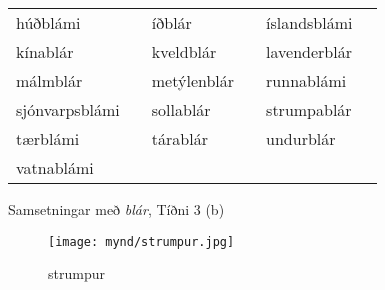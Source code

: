 \documentclass[../samsetningasafn.tex]{subfiles}
\begin{document}
\begin{wordlist}[H]
\begin{tcolorbox}

	\setlength{\extrarowheight}{3pt}
	\begin{tabular}{BlBlBl}		
		húðblámi	&	\phantom{baa}	& 		
		íðblár		&	\phantom{baa}	& 		
		íslandsblámi	&	\phantom{baa}	\\ 	
		kínablár		&		& 		
		kveldblár	&		& 		
		lavenderblár	&		\\ 	
		málmblár	&		& 	
		metýlenblár	&		& 	
		runnablámi	&		\\ 	
		sjónvarpsblámi &		& 	
		sollablár		&		& 		
		strumpablár	&		\\ 	
		tærblámi	&		& 		
		tárablár		&		& 	
		undurblár	&		\\ 	
		vatnablámi	&		& 	
					&		&
					&
	\end{tabular}

\end{tcolorbox}
	\caption{Samsetningar með \textit{blár}, Tíðni 3 (b)}
	\label{listi:blatt.3}
\end{wordlist}

\begin{figure}[H]
\begin{tcolorbox}
\centering
	\texttt{[image: mynd/strumpur.jpg]}
\end{tcolorbox}
	\caption{strumpur}
	\label{mynd:strumpur}
\end{figure}
\end{document}
